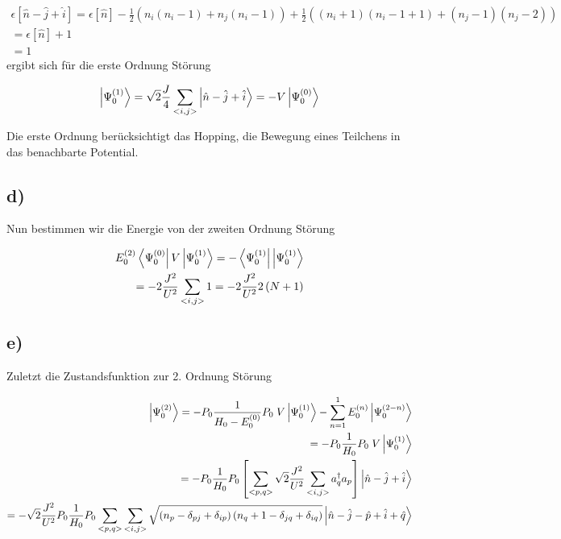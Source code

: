 \begin{align}
\epsilon \left[\hat{n} - \hat{j} + \hat{i} \right] = \epsilon \left[\hat{n} \right] - \frac{1}{2} \left( n_i \left( n_i -1 \right) + n_j \left( n_i -1 \right) \right) + \frac{1}{2} \left( \left( n_i +1 \right) \left( n_i -1 + 1 \right) + \left( n_j -1 \right) \left( n_j -2 \right) \right) \\
= \epsilon \left[\hat{n} \right] + 1 \\
= 1
\end{align}
ergibt sich f\"ur die erste Ordnung St\"orung

\begin{equation}
\Ket{\Psi_0^{\left( 1 \right)}} = \sqrt{2} \frac{J}{4} \sum_{<i,j>} \Ket{\hat{n} - \hat{j} + \hat{i}} = -V \Ket{\Psi_0^{\left( 0 \right)}}
\end{equation}

Die erste Ordnung ber\"ucksichtigt das Hopping, die Bewegung eines Teilchens in das benachbarte Potential.

\subsection{d)}

Nun bestimmen wir die Energie von der zweiten Ordnung St\"orung

\begin{align}
 E_0^{\left( 2 \right)} \Bra{\Psi_0^{\left( 0 \right)}} V \Ket{\Psi_0^{\left( 1 \right)}}
 = - \Bra{\Psi_0^{\left( 1 \right)}} \Ket{\Psi_0^{\left( 1 \right)}} \\
 = -2 \frac{J^2}{U^2} \sum_{<i,j>} 1 = -2 \frac{J^2}{U^2} 2 \left(N+1 \right)
\end{align}

\subsection{e)}

Zuletzt die Zustandsfunktion zur 2. Ordnung St\"orung

\begin{align}
\Ket{\Psi_0^{\left( 2 \right)}} = - P_0 \frac{1}{H_0 - E_0^{\left( 0 \right)}} P_0 \; V\Ket{\Psi_0^{\left( 1 \right)}} - \sum_{n=1}^1 E_0^{\left( n \right)} \Ket{\Psi_0^{\left( 2-n \right)}} \\
= - P_0 \frac{1}{H_0} P_0 \; V\Ket{\Psi_0^{\left( 1 \right)}} \\
= - P_0 \frac{1}{H_0} P_0 \left[ \sum_{<p,q>} \sqrt{2} \frac{J^2}{U^2} \sum_{<i,j>} a_q^{\dagger} a_p \right] \Ket{\hat{n} - \hat{j} + \hat{i}} \\
= - \sqrt{2} \frac{J^2}{U^2} P_0 \frac{1}{H_0} P_0 \sum_{<p,q>} \sum_{<i,j>} \sqrt{\left(n_p - \delta_{pj} + \delta_{ip} \right) \left( n_q + 1 - \delta_{jq} + \delta_{iq} \right)} \Ket{\hat{n} - \hat{j} -\hat{p} + \hat{i} +\hat{q}}
\end{align}

